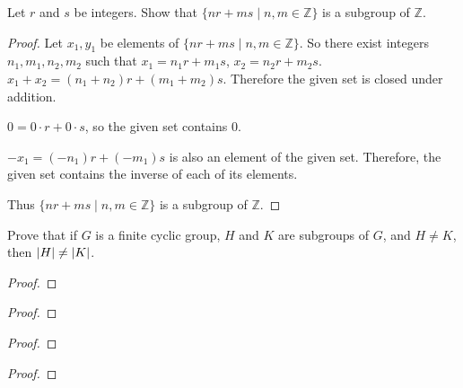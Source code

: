 \begin{exercise}
    Let $r$ and $s$ be integers. Show that $\{ nr + ms \mid n, m \in \mathbb{Z} \}$ is a subgroup of $\mathbb{Z}$.
\end{exercise}

\begin{proof}
    Let $x_{1}, y_{1}$ be elements of $\{ nr + ms \mid n, m \in \mathbb{Z} \}$. So there exist integers $n_{1}, m_{1}, n_{2}, m_{2}$ such that $x_{1} = n_{1}r + m_{1}s$, $x_{2} = n_{2}r + m_{2}s$. $x_{1} + x_{2} = (n_{1} + n_{2})r + (m_{1} + m_{2})s$. Therefore the given set is closed under addition.

    $0 = 0\cdot r + 0\cdot s$, so the given set contains $0$.

    $-x_{1} = (-n_{1})r + (-m_{1})s$ is also an element of the given set. Therefore, the given set contains the inverse of each of its elements.

    Thus $\{ nr + ms \mid n, m \in \mathbb{Z} \}$ is a subgroup of $\mathbb{Z}$.
\end{proof}

\begin{exercise}
    Prove that if $G$ is a finite cyclic group, $H$ and $K$ are subgroups of $G$, and $H\ne K$, then $\left\vert{H}\right\vert \ne \left\vert{K}\right\vert$.
\end{exercise}

\begin{proof}
\end{proof}

\begin{exercise}
\end{exercise}

\begin{proof}
\end{proof}

\begin{exercise}
\end{exercise}

\begin{proof}
\end{proof}

\begin{exercise}
\end{exercise}

\begin{proof}
\end{proof}

\begin{exercise}
\end{exercise}

